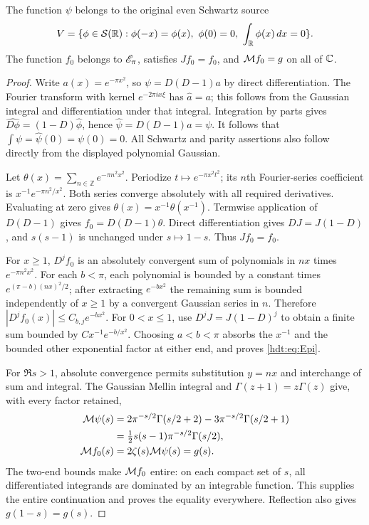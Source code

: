 \documentclass[11pt]{article}
\begin{document}
\begin{hdtlemma}\label{hdt:lem:theta-source}
The function $\psi$ belongs to the original even Schwartz source
\[
V=\{\phi\in\hdtSch(\hdtR):\phi(-x)=\phi(x),\ \phi(0)=0,
\ \int_\hdtR\phi(x)\,dx=0\}.
\]
The function $f_0$ belongs to $\mathscr E_\pi$, satisfies $Jf_0=f_0$, and
$\mathcal M f_0=g$ on all of $\mathbb C$.
\end{hdtlemma}
\begin{proof}
Write $a(x)=e^{-\pi x^2}$, so $\psi=D(D-1)a$ by direct
differentiation. The Fourier transform with kernel $e^{-2\pi ix\xi}$
has $\widehat a=a$; this follows from the Gaussian integral and
differentiation under that integral. Integration by parts gives
$\widehat{D\phi}=(1-D)\widehat\phi$, hence
$\widehat\psi=D(D-1)a=\psi$. It follows that
$\int\psi=\widehat\psi(0)=\psi(0)=0$. All Schwartz and parity
assertions also follow directly from the displayed polynomial Gaussian.

Let $\theta(x)=\sum_{n\in\mathbb Z}e^{-\pi n^2x^2}$.
Periodize $t\mapsto e^{-\pi x^2t^2}$; its $n$th Fourier-series
coefficient is $x^{-1}e^{-\pi n^2/x^2}$. Both series converge
absolutely with all required derivatives. Evaluating at zero gives
$\theta(x)=x^{-1}\theta(x^{-1})$. Termwise application of
$D(D-1)$ gives $f_0=D(D-1)\theta$. Direct differentiation gives
$DJ=J(1-D)$, and $s(s-1)$ is unchanged under $s\mapsto1-s$.
Thus $Jf_0=f_0$.

For $x\geq1$, $D^jf_0$ is an absolutely convergent sum of
polynomials in $nx$ times $e^{-\pi n^2x^2}$. For each $b<\pi$,
each polynomial is bounded by a constant times
$e^{(\pi-b)(nx)^2/2}$; after extracting $e^{-bx^2}$ the
remaining sum is bounded independently of $x\geq1$ by a convergent
Gaussian series in $n$. Therefore $|D^jf_0(x)|\leq C_{b,j}e^{-bx^2}$.
For $0<x\leq1$, use $D^jJ=J(1-D)^j$ to obtain a finite sum
bounded by $Cx^{-1}e^{-b/x^2}$. Choosing $a<b<\pi$ absorbs
the $x^{-1}$ and the bounded other exponential factor at either end,
and proves \eqref{hdt:eq:Epi}.

For $\Re s>1$, absolute convergence permits substitution $y=nx$
and interchange of sum and integral. The Gaussian Mellin integral
and $\Gamma(z+1)=z\Gamma(z)$ give, with every factor retained,
\[
\begin{split}
\mathcal M\psi(s)
&=2\pi^{-s/2}\Gamma(s/2+2)-3\pi^{-s/2}\Gamma(s/2+1)\\
&=\tfrac12s(s-1)\pi^{-s/2}\Gamma(s/2),\\
\mathcal M f_0(s)&=2\zeta(s)\mathcal M\psi(s)=g(s).
\end{split}
\]
The two-end bounds make $\mathcal M f_0$ entire: on each compact
set of $s$, all differentiated integrands are dominated by an
integrable function. This supplies the entire continuation and proves
the equality everywhere. Reflection also gives $g(1-s)=g(s)$.
\end{proof}
\end{document}
